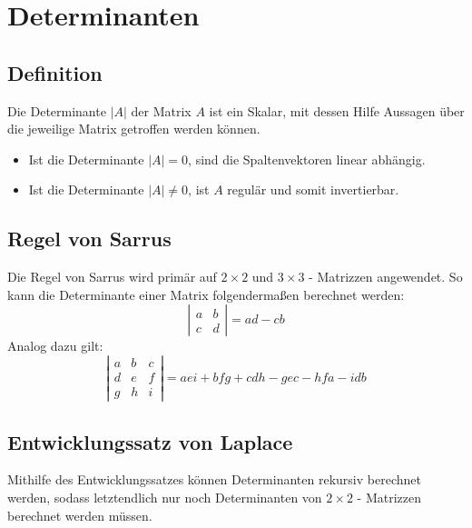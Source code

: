 
\section{Determinanten}
\label{sec:determinanten}

\subsection{Definition}
\label{sub:definition-determinanten}

Die Determinante $|A|$ der Matrix $A$ ist ein Skalar, mit dessen Hilfe Aussagen über die jeweilige Matrix getroffen
werden können.
\begin{itemize}
	\item Ist die Determinante $|A| = 0$, sind die Spaltenvektoren linear abhängig.
	\item Ist die Determinante $|A| \neq 0$, ist $A$ regulär und somit invertierbar.
\end{itemize}

\subsection{Regel von Sarrus}
\label{sub:regel_von_sarrus}

Die Regel von Sarrus wird primär auf $2 \times 2$ und $3 \times 3$ - Matrizzen angewendet. So kann die Determinante
einer Matrix folgendermaßen berechnet werden: 
\begin{equation}
	\left| \begin{matrix}a & b \\ c & d\end{matrix}\right| = ad - cb
\end{equation}
Analog dazu gilt:
\begin{equation}
	\left| \begin{matrix}a & b & c \\ d & e & f \\ g & h & i \end{matrix} \right| = aei + bfg + cdh - gec - hfa - idb
\end{equation}

\subsection{Entwicklungssatz von Laplace}
\label{sub:entwicklungssatz_von_laplace}
Mithilfe des Entwicklungssatzes können Determinanten rekursiv berechnet werden, sodass letztendlich nur noch
Determinanten von $2 \times 2$ - Matrizzen berechnet werden müssen.